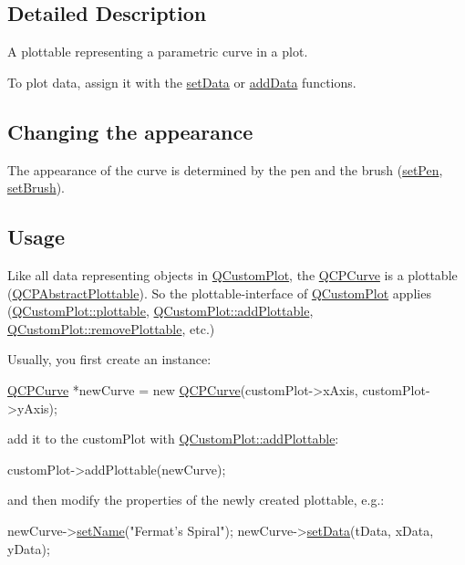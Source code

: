 \subsection{Detailed Description}
A plottable representing a parametric curve in a plot. 

To plot data, assign it with the \hyperlink{classQCPCurve_a631ac886708460013b30052f49cbc9da}{set\-Data} or \hyperlink{classQCPCurve_a4e24023c3b9ac75440c7a260172c99af}{add\-Data} functions.\hypertarget{classQCPStatisticalBox_appearance}{}\subsection{Changing the appearance}\label{classQCPStatisticalBox_appearance}
The appearance of the curve is determined by the pen and the brush (\hyperlink{classQCPAbstractPlottable_ab74b09ae4c0e7e13142fe4b5bf46cac7}{set\-Pen}, \hyperlink{classQCPAbstractPlottable_a7a4b92144dca6453a1f0f210e27edc74}{set\-Brush}). \hypertarget{classQCPStatisticalBox_usage}{}\subsection{Usage}\label{classQCPStatisticalBox_usage}
Like all data representing objects in \hyperlink{classQCustomPlot}{Q\-Custom\-Plot}, the \hyperlink{classQCPCurve}{Q\-C\-P\-Curve} is a plottable (\hyperlink{classQCPAbstractPlottable}{Q\-C\-P\-Abstract\-Plottable}). So the plottable-\/interface of \hyperlink{classQCustomPlot}{Q\-Custom\-Plot} applies (\hyperlink{classQCustomPlot_a32de81ff53e263e785b83b52ecd99d6f}{Q\-Custom\-Plot\-::plottable}, \hyperlink{classQCustomPlot_ab7ad9174f701f9c6f64e378df77927a6}{Q\-Custom\-Plot\-::add\-Plottable}, \hyperlink{classQCustomPlot_af3dafd56884208474f311d6226513ab2}{Q\-Custom\-Plot\-::remove\-Plottable}, etc.)

Usually, you first create an instance\-: 
\begin{DoxyCode}
\hyperlink{classQCPCurve}{QCPCurve} *newCurve = \textcolor{keyword}{new} \hyperlink{classQCPCurve_a36de58e2652b3fa47bdf9187d421d3ce}{QCPCurve}(customPlot->xAxis, customPlot->yAxis);
\end{DoxyCode}
 add it to the custom\-Plot with \hyperlink{classQCustomPlot_ab7ad9174f701f9c6f64e378df77927a6}{Q\-Custom\-Plot\-::add\-Plottable}\-: 
\begin{DoxyCode}
customPlot->addPlottable(newCurve);
\end{DoxyCode}
 and then modify the properties of the newly created plottable, e.\-g.\-: 
\begin{DoxyCode}
newCurve->\hyperlink{classQCPAbstractPlottable_ab79c7ba76bc7fa89a4b3580e12149f1f}{setName}(\textcolor{stringliteral}{"Fermat's Spiral"});
newCurve->\hyperlink{classQCPCurve_a631ac886708460013b30052f49cbc9da}{setData}(tData, xData, yData);
\end{DoxyCode}
 

